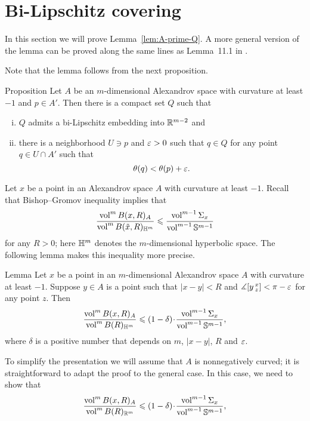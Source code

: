 \section{Bi-Lipschitz covering}\label{sec:bilip}

In this section we will prove Lemma~\ref{lem:A-prime-Q}.
A more general version of the lemma can be proved along the same lines as Lemma~11.1 in \cite{simon}.

Note that the lemma follows from the next proposition.


\begin{thm}{Proposition}\label{prop:Q-covering}
Let $A$ be an $m$-dimensional Alexandrov space with curvature at least $-1$ and $p\in A'$.
Then there is a compact set $Q$ such that 
\begin{enumerate}[(i)]
 \item $Q$ admits a bi-Lipschitz embedding into $\mathbb{R}^{m-2}$ and
 \item there is a neighborhood $U\ni p$ and $\varepsilon>0$ such that $q\in Q$ for any point $q\in U\cap A'$ such that 
 \[\theta(q)<\theta(p)+\varepsilon.\]
\end{enumerate}
\end{thm}

Let $x$ be a point in an Alexandrov space $A$ with curvature at least $-1$.
Recall that Bishop--Gromov inequality implies that 
\[\frac{\operatorname{vol}^m B(x,R)_A}{\operatorname{vol}^m B(\tilde x,R)_{\mathbb{H}^m}}
\leqslant
\frac{\operatorname{vol}^{m-1} \Sigma_x}{\operatorname{vol}^{m-1} \mathbb{S}^{m-1}}\]
for any $R>0$; here $\mathbb{H}^m$ denotes the $m$-dimensional hyperbolic space.
The following lemma makes this inequality more precise. 

\begin{thm}{Lemma}
Let $x$ be a point in an $m$-dimensional Alexandrov space $A$ with curvature at least $-1$.
Suppose $y\in A$ is a point such that $|x-y|<R$ and $\measuredangle[y\,{}^{x}_{z}]<\pi-\varepsilon$ for any point $z$.
Then
\[\frac{\vol^m B(x,R)_A}{\vol^m B(R)_{\HH^m}}
\le
(1-\delta)\cdot\frac{\vol^{m-1} \Sigma_x}{\vol^{m-1} \SS^{m-1}},\]
where $\delta$ is a positive number that depends on $m$, $|x-y|$, $R$ and $\varepsilon$.
 
\end{thm}

To simplify the presentation we will assume that $A$ is nonnegatively curved;
it is straightforward to adapt the proof to the general case.
In this case, we need to show that 
\[\frac{\vol^m B(x,R)_A}{\vol^m B(R)_{\RR^m}}
\le 
(1-\delta)\cdot\frac{\vol^{m-1} \Sigma_x}{\vol^{m-1} \SS^{m-1}},\]

